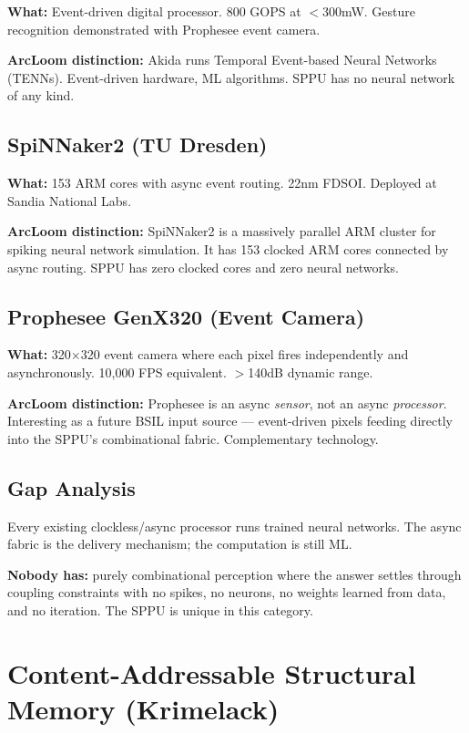 \documentclass[11pt, a4paper]{article}
\begin{document}
\textbf{What:} Event-driven digital processor. 800 GOPS at $<$300mW.
Gesture recognition demonstrated with Prophesee event camera.

\textbf{ArcLoom distinction:} Akida runs Temporal Event-based Neural
Networks (TENNs). Event-driven hardware, ML algorithms. SPPU has no
neural network of any kind.

\subsection{SpiNNaker2 (TU Dresden)}

\textbf{What:} 153 ARM cores with async event routing. 22nm FDSOI.
Deployed at Sandia National Labs.

\textbf{ArcLoom distinction:} SpiNNaker2 is a massively parallel ARM
cluster for spiking neural network simulation. It has 153 clocked ARM
cores connected by async routing. SPPU has zero clocked cores and zero
neural networks.

\subsection{Prophesee GenX320 (Event Camera)}

\textbf{What:} 320$\times$320 event camera where each pixel fires
independently and asynchronously. 10,000 FPS equivalent. $>$140dB
dynamic range.

\textbf{ArcLoom distinction:} Prophesee is an async \textit{sensor},
not an async \textit{processor}. Interesting as a future BSIL input
source --- event-driven pixels feeding directly into the SPPU's
combinational fabric. Complementary technology.

\subsection{Gap Analysis}

Every existing clockless/async processor runs trained neural networks.
The async fabric is the delivery mechanism; the computation is still ML.

\textbf{Nobody has:} purely combinational perception where the answer
settles through coupling constraints with no spikes, no neurons, no
weights learned from data, and no iteration. The SPPU is unique in
this category.

\section{Content-Addressable Structural Memory (Krimelack)}
\end{document}
